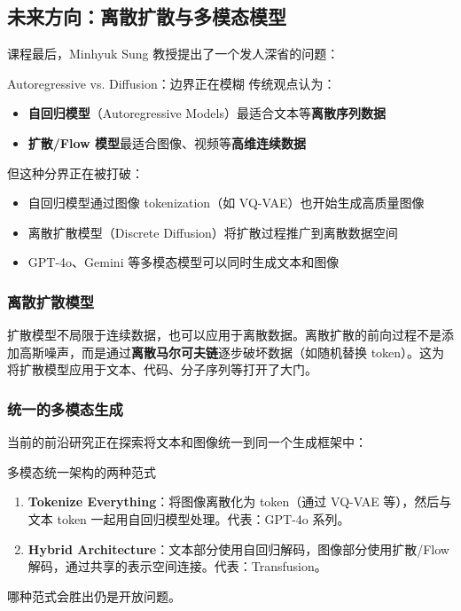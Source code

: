 \subsection{未来方向：离散扩散与多模态模型}

课程最后，Minhyuk Sung 教授提出了一个发人深省的问题：

\begin{importantbox}{Autoregressive vs. Diffusion：边界正在模糊}
传统观点认为：
\begin{itemize}
    \item \textbf{自回归模型}（Autoregressive Models）最适合文本等\textbf{离散序列数据}
    \item \textbf{扩散/Flow 模型}最适合图像、视频等\textbf{高维连续数据}
\end{itemize}

但这种分界正在被打破：
\begin{itemize}
    \item 自回归模型通过图像 tokenization（如 VQ-VAE）也开始生成高质量图像
    \item 离散扩散模型（Discrete Diffusion）将扩散过程推广到离散数据空间
    \item GPT-4o、Gemini 等多模态模型可以同时生成文本和图像
\end{itemize}
\end{importantbox}

\subsubsection{离散扩散模型}

扩散模型不局限于连续数据，也可以应用于离散数据。离散扩散的前向过程不是添加高斯噪声，而是通过\textbf{离散马尔可夫链}逐步破坏数据（如随机替换 token）。这为将扩散模型应用于文本、代码、分子序列等打开了大门。

\subsubsection{统一的多模态生成}

当前的前沿研究正在探索将文本和图像统一到同一个生成框架中：

\begin{knowledgebox}{多模态统一架构的两种范式}
\begin{enumerate}
    \item \textbf{Tokenize Everything}：将图像离散化为 token（通过 VQ-VAE 等），然后与文本 token 一起用自回归模型处理。代表：GPT-4o 系列。
    \item \textbf{Hybrid Architecture}：文本部分使用自回归解码，图像部分使用扩散/Flow 解码，通过共享的表示空间连接。代表：Transfusion。
\end{enumerate}

哪种范式会胜出仍是开放问题。
\end{knowledgebox}

